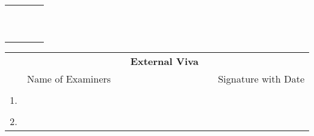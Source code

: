 \ifIDP
\begin{table}[H]
	\centering
\begin{tabular}{p{}p{}p{}c}
 &&&\\
 &&&\\
\centering{\printGuideNameA} & &\centering{\printHOD} &\\
\centering{Guide} & & \centering{Head of the Department}& \\
& & &\\
& & & \\
& & & \\
\centering{\printDA} &  & \centering{\printPrincipal} &\\
\centering{Dean Academics} & & \centering{Principal} &\\
&&&\\
\end{tabular}%
\end{table}
\else
\begin{table}[H]
\centering
{}
\end{table}
\fi
\ifStuNameCUsed \vspace{-0.75cm}\fi
\begin{table}[H]
\centering
\begin{tabular}{lccp{6cm}cc}
&&&\textbf{\Large External Viva}&&\\
&Name of Examiners &&& & Signature with Date\\
&&&&&\\
1.&&&&&\\
&&&&&\\
2.&&&&&\\
\end{tabular}%
\end{table}
